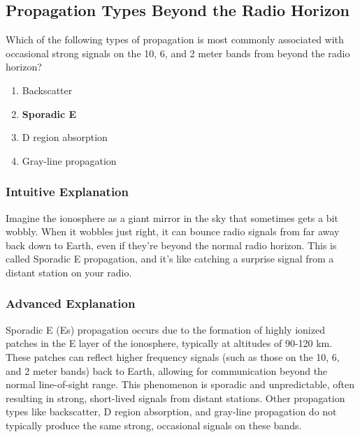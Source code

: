\subsection{Propagation Types Beyond the Radio Horizon}
\label{T3C04}

\begin{tcolorbox}[colback=gray!10!white,colframe=black!75!black,title=T3C04]
Which of the following types of propagation is most commonly associated with occasional strong signals on the 10, 6, and 2 meter bands from beyond the radio horizon?
\begin{enumerate}[noitemsep]
    \item Backscatter
    \item \textbf{Sporadic E}
    \item D region absorption
    \item Gray-line propagation
\end{enumerate}
\end{tcolorbox}

\subsubsection*{Intuitive Explanation}
Imagine the ionosphere as a giant mirror in the sky that sometimes gets a bit wobbly. When it wobbles just right, it can bounce radio signals from far away back down to Earth, even if they’re beyond the normal radio horizon. This is called Sporadic E propagation, and it’s like catching a surprise signal from a distant station on your radio.

\subsubsection*{Advanced Explanation}
Sporadic E (Es) propagation occurs due to the formation of highly ionized patches in the E layer of the ionosphere, typically at altitudes of 90-120 km. These patches can reflect higher frequency signals (such as those on the 10, 6, and 2 meter bands) back to Earth, allowing for communication beyond the normal line-of-sight range. This phenomenon is sporadic and unpredictable, often resulting in strong, short-lived signals from distant stations. Other propagation types like backscatter, D region absorption, and gray-line propagation do not typically produce the same strong, occasional signals on these bands.